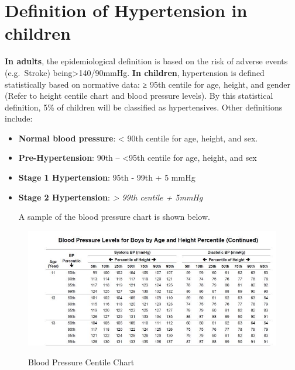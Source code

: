 \documentclass[
  letterpaper,
  DIV=11,
  numbers=noendperiod]{scrreprt}
\begin{document}
\hypertarget{definition-of-hypertension-in-children}{%
\section{Definition of Hypertension in
children}\label{definition-of-hypertension-in-children}}

\textbf{In adults}, the epidemiological definition is based on the risk
of adverse events (e.g.~Stroke) being\textgreater140/90mmHg. \textbf{In
children}, hypertension is defined statistically based on normative
data: ≥ 95th centile for age, height, and gender (Refer to height
centile chart and blood pressure levels). By this statistical
definition, 5\% of children will be classified as hypertensives. Other
definitions include:

\begin{itemize}
\item
  \textbf{Normal blood pressure}: \textless{} 90th centile for age,
  height, and sex.
\item
  \textbf{Pre-Hypertension}: 90th -- \textless95th centile for age,
  height, and sex
\item
  \textbf{Stage 1 Hypertension}: 95th - 99th + 5 mmHg
\item
  \textbf{Stage 2 Hypertension}: \emph{\textgreater{} 99th centile +
  5mmHg}

  A sample of the blood pressure chart is shown below.
\end{itemize}

\begin{figure}

{\centering 

\href{https://www.bing.com/ck/a?!\&\&p=03173e8901eee155JmltdHM9MTcwODkwNTYwMCZpZ3VpZD0xMTM3ZDFjZC1mMmJmLTY1YzctMjQ4My1jMmI3ZjNkODY0NjUmaW5zaWQ9NTE5NA\&ptn=3\&ver=2\&hsh=3\&fclid=1137d1cd-f2bf-65c7-2483-c2b7f3d86465\&psq=blood+pressure+pediatric+centile+charts+pdf\&u=a1aHR0cHM6Ly93d3cubmhsYmkubmloLmdvdi9maWxlcy9kb2NzL2d1aWRlbGluZXMvY2hpbGRfdGJsLnBkZg\&ntb=1}{\includegraphics{bpchart.jpg}}

}

\caption{Blood Pressure Centile Chart}

\end{figure}
\end{document}
